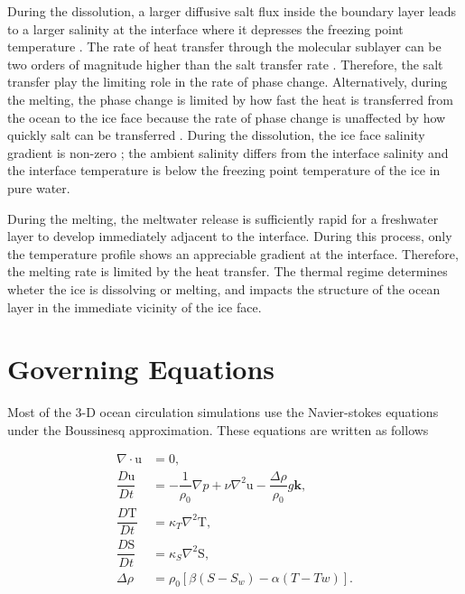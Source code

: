 \documentclass[11pt,a4paper]{article}
\begin{document}
	During the dissolution, a larger diffusive salt flux inside the boundary layer leads to a larger salinity at the interface where it depresses the freezing point temperature \citep{gayen2016simulation}. The rate of heat transfer through the molecular sublayer can be two orders of magnitude higher than the salt transfer rate \citep{mcphee1987dynamics,malyarenko2020synthesis}. Therefore, the salt transfer play the limiting role in the rate of phase change. Alternatively, during the melting, the phase change is limited by how fast the heat is transferred from the ocean to the ice face because the rate of phase change is unaffected by how quickly salt can be transferred \citep{malyarenko2020synthesis}. During the dissolution, the ice face salinity gradient is non-zero \citep{kerr2015dissolution}; the ambient salinity differs from the interface salinity and the interface temperature is below the freezing point temperature of the ice in pure water.
	
	During the melting, the meltwater release is sufficiently rapid for a freshwater layer to develop immediately adjacent to the interface. During this process, only the temperature profile shows an appreciable gradient at the interface. Therefore, the melting rate is limited by the heat transfer. The thermal regime determines wheter the ice is dissolving or melting, and impacts the structure of the ocean layer in the immediate vicinity of the ice face.
	
	\section{Governing Equations}
	
	Most of the 3-D ocean circulation simulations use the Navier-stokes equations under the Boussinesq approximation. These equations are written as follows
	
	\begin{align}
		\nabla\cdot\mathrm{u} &= 0,\\
		\dfrac{D\mathrm{u}}{Dt} & = -\dfrac{1}{\rho_0}\nabla p + \nu\nabla^2\mathrm{u} - \dfrac{\Delta\rho}{\rho_0}g\mathbf{k},\\
		\dfrac{D\mathrm{T}}{Dt} & = \kappa_T\nabla^2\mathrm{T} ,\\ \label{eq:3}
		\dfrac{D\mathrm{S}}{Dt} & = \kappa_S\nabla^2\mathrm{S} ,\\ \label{eq:4}
		\Delta\rho &=\rho_0\left[ \beta(S-S_w) - \alpha(T-Tw)\right].
	\end{align}
\end{document}
